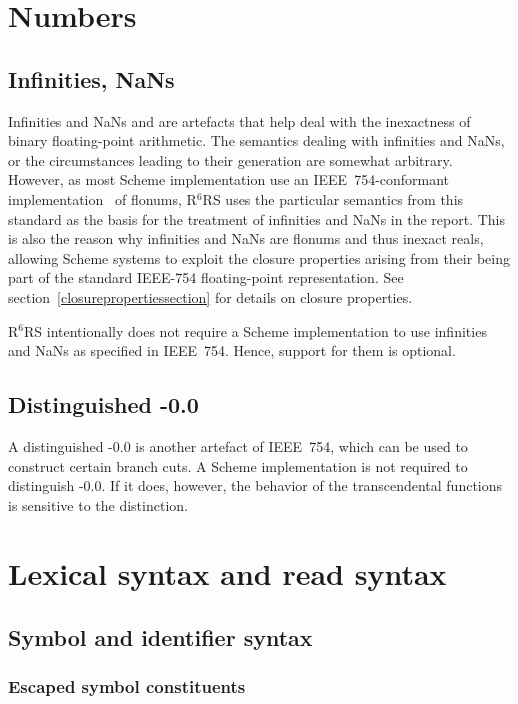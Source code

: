 \documentclass[twoside,twocolumn]{algol60}
\newcommand{\rn}[1]{R$^{#1}$RS}
\begin{document}
\chapter{Numbers}
\label{numberschapter}

\section{Infinities, NaNs}
\label{infinitiesnansection}

Infinities and NaNs and are artefacts that help deal with the
inexactness of binary floating-point arithmetic.  The semantics
dealing with infinities and NaNs, or the circumstances leading to
their generation are somewhat arbitrary.  However, as most Scheme
implementation use an IEEE~754-conformant implementation~\cite{IEEE}
of flonums, \rn{6} uses the particular semantics from this standard as
the basis for the treatment of infinities and NaNs in the report.
This is also the reason why infinities and NaNs are flonums and thus
inexact reals, allowing Scheme systems to exploit the closure
properties arising from their being part of the standard IEEE-754
floating-point representation.  See
section~\ref{closurepropertiessection} for details on closure
properties.

\rn{6} intentionally does not require a Scheme implementation to use
infinities and NaNs as specified in IEEE~754.  Hence, support for them
is optional.

\section{Distinguished -0.0}
 
A distinguished -0.0 is another artefact of IEEE~754, which can be
used to construct certain branch cuts.  A Scheme implementation is not
required to distinguish -0.0.  If it does, however, the behavior of
the transcendental functions is sensitive to the distinction.  

\chapter{Lexical syntax and read syntax}

\section{Symbol and identifier syntax}

\subsection{Escaped symbol constituents}
\end{document}

